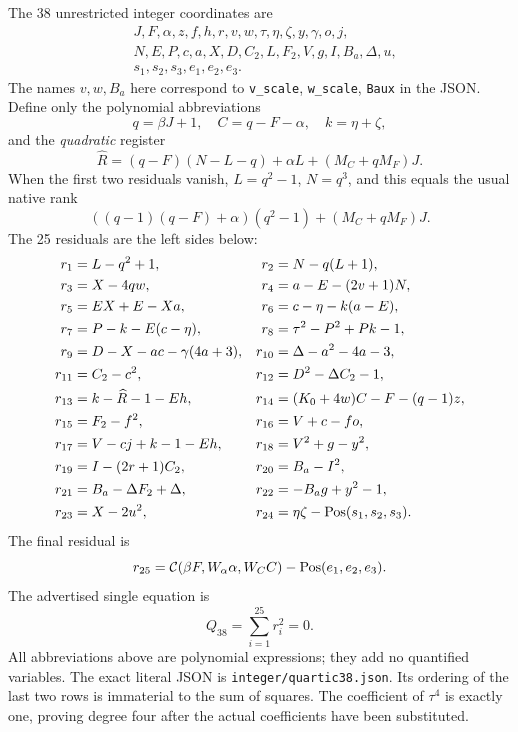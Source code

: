 \documentclass[11pt]{article}
\theoremstyle{remark}\newtheorem{remark}[theorem]{Remark}
\begin{document}
The 38 unrestricted integer coordinates are
\begin{align*}
 &J,F,\alpha,z,f,h,r,v,w,\tau,\eta,\zeta,y,\gamma,o,j,\\
 &N,E,P,c,a,X,D,C_2,L,F_2,V,g,I,B_a,\Delta,u,\\
 &s_1,s_2,s_3,e_1,e_2,e_3.
\end{align*}
The names $v,w,B_a$ here correspond to \texttt{v\_scale}, \texttt{w\_scale}, \texttt{Baux} in the JSON. Define only the polynomial abbreviations
\[
 q=\beta J+1,\quad C=q-F-\alpha,\quad k=\eta+\zeta,
\]
and the \emph{quadratic} register
\[
 \widehat R=(q-F)(N-L-q)+\alpha L+(M_C+qM_F)J.
\]
When the first two residuals vanish, $L=q^2-1$, $N=q^3$, and this equals the usual native rank
\[
 ((q-1)(q-F)+\alpha)(q^2-1)+(M_C+qM_F)J.
\]
The 25 residuals are the left sides below:
\begin{align}
 r_1&=L-q^2+1, & r_2&=N-q(L+1),\nonumber\\
 r_3&=X-4qw, & r_4&=a-E-(2v+1)N,\nonumber\\
 r_5&=EX+E-Xa, & r_6&=c-\eta-k(a-E),\nonumber\\
 r_7&=P-k-E(c-\eta), & r_8&=\tau^2-P^2+Pk-1,\nonumber\\
 r_9&=D-X-ac-\gamma(4a+3), & r_{10}&=\Delta-a^2-4a-3,\nonumber\\
 r_{11}&=C_2-c^2, & r_{12}&=D^2-\Delta C_2-1,\nonumber\\
 r_{13}&=k-\widehat R-1-Eh, &
 r_{14}&=(K_0+4w)C-F-(q-1)z,\nonumber\\
 r_{15}&=F_2-f^2, & r_{16}&=V+c-fo,\nonumber\\
 r_{17}&=V-cj+k-1-Eh, & r_{18}&=V^2+g-y^2,\nonumber\\
 r_{19}&=I-(2r+1)C_2, & r_{20}&=B_a-I^2,\nonumber\\
 r_{21}&=B_a-\Delta F_2+\Delta, & r_{22}&=-B_ag+y^2-1,\nonumber\\
 r_{23}&=X-2u^2, & r_{24}&=\eta\zeta-\operatorname{Pos}(s_1,s_2,s_3).\label{eq:rows}
\end{align}
The final residual is
\[
 r_{25}=\mathcal C(\beta F,W_\alpha\alpha,W_C C)-\operatorname{Pos}(e_1,e_2,e_3).
\]
The advertised single equation is
\begin{equation}\boxed{\displaystyle Q_{38}=\sum_{i=1}^{25}r_i^2=0.}\label{eq:Q38}\end{equation}
All abbreviations above are polynomial expressions; they add no quantified variables. The exact literal JSON is \texttt{integer/quartic38.json}. Its ordering of the last two rows is immaterial to the sum of squares. The coefficient of $\tau^4$ is exactly one, proving degree four after the actual coefficients have been substituted.
\end{document}
